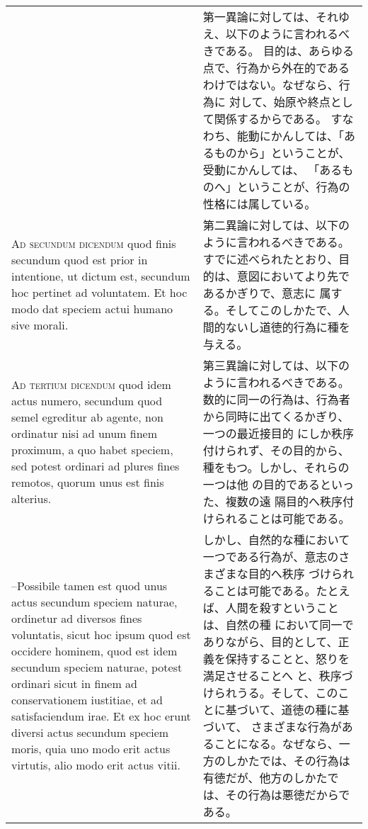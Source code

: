 \documentclass[10pt]{jsarticle} %
\begin{document}
\begin{longtable}{p{21em}p{21em}}
&

第一異論に対しては、それゆえ、以下のように言われるべきである。
目的は、あらゆる点で、行為から外在的であるわけではない。なぜなら、行為に
 対して、始原や終点として関係するからである。
すなわち、能動にかんしては、「あるものから」ということが、受動にかんしては、
 「あるものへ」ということが、行為の性格には属している。



\\


{\scshape Ad secundum dicendum} quod finis secundum
quod est prior in intentione, ut dictum est, secundum hoc pertinet ad
voluntatem. Et hoc modo dat speciem actui humano sive morali.


&

第二異論に対しては、以下のように言われるべきである。
すでに述べられたとおり、目的は、意図においてより先であるかぎりで、意志に
 属する。そしてこのしかたで、人間的ないし道徳的行為に種を与える。


\\


{\scshape Ad tertium dicendum} quod idem actus
numero, secundum quod semel egreditur ab agente, non ordinatur nisi ad
unum finem proximum, a quo habet speciem, sed potest ordinari ad plures
fines remotos, quorum unus est finis alterius. 



&

第三異論に対しては、以下のように言われるべきである。
数的に同一の行為は、行為者から同時に出てくるかぎり、一つの最近接目的
 にしか秩序付けられず、その目的から、種をもつ。しかし、それらの一つは他
 の目的であるといった、複数の遠
 隔目的へ秩序付けられることは可能である。


\\

--Possibile tamen est quod
unus actus secundum speciem naturae, ordinetur ad diversos fines
voluntatis, sicut hoc ipsum quod est occidere hominem, quod est idem
secundum speciem naturae, potest ordinari sicut in finem ad
conservationem iustitiae, et ad satisfaciendum irae. Et ex hoc erunt
diversi actus secundum speciem moris, quia uno modo erit actus virtutis,
alio modo erit actus vitii. 


&


 しかし、自然的な種において一つである行為が、意志のさまざまな目的へ秩序
 づけられることは可能である。たとえば、人間を殺すということは、自然の種
 において同一でありながら、目的として、正義を保持することと、怒りを満足させることへ
 と、秩序づけられうる。そして、このことに基づいて、道徳の種に基づいて、
 さまざまな行為があることになる。なぜなら、一方のしかたでは、その行為は
 有徳だが、他方のしかたでは、その行為は悪徳だからである。




\end{longtable}
\end{document}
